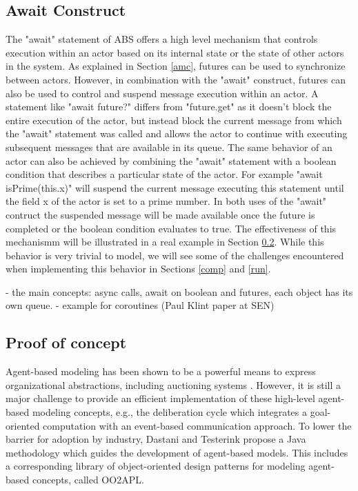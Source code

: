 \subsection{Await Construct}
The "await" statement of ABS offers a high level mechanism that controls execution within an actor based on its internal state or the state of other actors in the system. As explained in Section \ref{amc}, futures can be used to synchronize between actors. However, in combination with the "await" construct, futures can also be used to control and suspend message execution within an actor. A statement like "await future?" differs from "future.get" as it doesn't block the entire execution of the actor, but instead block the current message from which the "await" statement was called and allows the actor to continue with executing subsequent messages that are available in its queue. The same behavior of an actor can also be achieved by combining the "await" statement with a boolean condition that describes a particular state of the actor. For example "await isPrime(this.x)" will suspend the current message executing this statement until the field x of the actor is set to a prime number. In both uses of the "await" contruct the suspended message will be made available once the future is completed or the boolean condition evaluates to true. The effectiveness of this mechanismm will be illustrated in a real example in Section \ref{ag}. While this behavior is very trivial to model, we will see some of the challenges encountered when implementing this behavior in Sections \ref{comp} and \ref{run}.        

- the main concepts: async calls, await on boolean and futures, each object has its own queue.
- example for coroutines (Paul Klint paper at SEN)

\subsection{Proof of concept}
\label{ag}

Agent-based modeling has been shown to be a powerful means to express organizational abstractions, including auctioning systems \cite{agent_auction,bas16}.
However, it is still a major challenge to provide an efficient implementation of these high-level agent-based modeling concepts, e.g., the deliberation cycle which integrates a goal-oriented computation with an event-based communication approach. 
To lower the barrier for adoption by industry, Dastani and Testerink \cite{bas16} propose a Java methodology which guides the development of agent-based models. 
This includes a corresponding library of object-oriented design patterns for modeling agent-based concepts, called OO2APL. 

